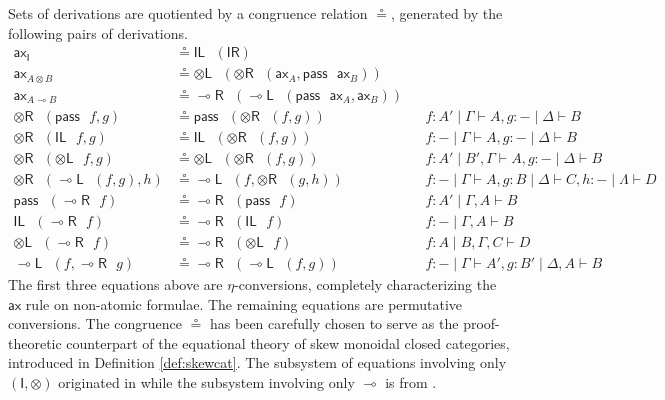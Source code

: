 \documentclass[copyright,creativecommons]{eptcs}
\theoremstyle{definition}
\newcommand{\tl}{\otimes \mathsf{L}}
\newcommand{\tr}{\otimes \mathsf{R}}
\newcommand{\lright}{{\multimap}\mathsf{R}}
\newcommand{\lleft}{{\multimap}\mathsf{L}}
\newcommand{\pass}{\mathsf{pass}}
\newcommand{\unitl}{\mathsf{IL}}
\newcommand{\unitr}{\mathsf{IR}}
\newcommand{\ax}{\mathsf{ax}}
\newcommand{\ot}{\otimes}
\newcommand{\lolli}{\multimap}
\newcommand{\I}{\mathsf{I}}
\begin{document}
Sets of derivations are quotiented by a congruence relation $\circeq$, generated by the following pairs of derivations.
\begin{equation}
\label{fig:circeq}
\begin{array}{rlll}
  \ax_{\I} &\circeq \unitl \text{ } (\unitr)
  \\
  \ax_{A \ot B} &\circeq \tl \text{ } (\tr \text{ } (\ax_{A} , \pass \text{ } \ax_{B}))
  \\
  \ax_{A \lolli B} &\circeq \lright \text{ } (\lleft \text{ } (\pass \text{ } \ax_{A}, \ax_{B} ))
  \\
  \tr \text{ } (\pass \text{ } f, g) &\circeq \pass \text{ } (\tr \text{ } (f, g)) &&f : A' \mid \Gamma \vdash A, g : {-} \mid \Delta \vdash B
  \\
  \tr \text{ } (\unitl \text{ } f, g) &\circeq \unitl \text{ } (\tr \text{ } (f , g)) &&f : {-} \mid \Gamma \vdash A , g : {-} \mid \Delta \vdash B
  \\
  \tr \text{ } (\tl \text{ } f, g) &\circeq \tl \text{ } (\tr \text{ } (f , g)) &&f : A' \mid B' , \Gamma \vdash A , g : {-} \mid \Delta \vdash B
  \\
  \tr \text{ } (\lleft \text{ } (f , g), h) & \circeq \lleft \text{ } (f, \tr \text{ } (g, h)) &&f: {-} \mid \Gamma \vdash A, g : B \mid \Delta \vdash C, h : {-} \mid \Lambda \vdash D
  \\
  \pass \text{ } (\lright \text{ } f) &\circeq \lright \text{ } (\pass \text{ } f) &&f : A' \mid \Gamma , A \vdash B
  \\
  \unitl \text{ } (\lright \text{ } f) &\circeq \lright \text{ } (\unitl \text{ } f) &&f : {-} \mid \Gamma , A \vdash B
  \\
  \tl \text{ } (\lright \text{ } f) &\circeq \lright \text{ } (\tl \text{ } f) &&f : A \mid B , \Gamma , C \vdash D
  \\
  \lleft \text{ } (f, \lright \text{ } g) &\circeq \lright \text{ } (\lleft \text{ } (f, g)) &&f : {-} \mid \Gamma \vdash A', g : B' \mid \Delta , A \vdash B
\end{array}
\end{equation}
The first three equations above are $\eta$-conversions, completely characterizing the $\ax$ rule on non-atomic formulae. The remaining equations are permutative conversions. The congruence $\circeq$ has been carefully chosen to serve as the proof-theoretic counterpart of the equational theory of skew monoidal closed categories, introduced in Definition \ref{def:skewcat}. The subsystem of equations involving only $(\I,\ot)$ originated in \cite{uustalu:sequent:2021} while the subsystem involving only $\lolli$ is from \cite{uustalu:deductive:nodate}.
\end{document}
